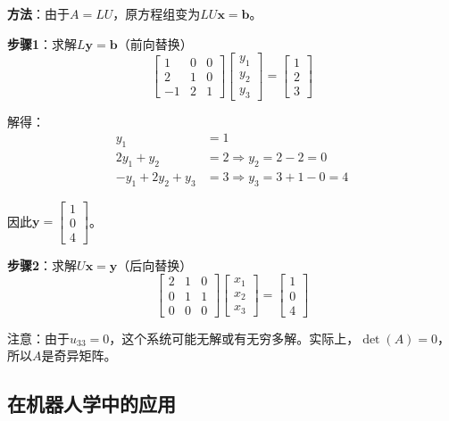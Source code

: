 \documentclass[12pt,a4paper]{article}
\begin{document}
\textbf{方法}：由于$A = LU$，原方程组变为$LU\bm{x} = \bm{b}$。

\textbf{步骤1}：求解$L\bm{y} = \bm{b}$（前向替换）
\begin{equation}
\begin{bmatrix} 1 & 0 & 0 \\ 2 & 1 & 0 \\ -1 & 2 & 1 \end{bmatrix} \begin{bmatrix} y_1 \\ y_2 \\ y_3 \end{bmatrix} = \begin{bmatrix} 1 \\ 2 \\ 3 \end{bmatrix}
\end{equation}

解得：
\begin{align}
y_1 &= 1 \\
2y_1 + y_2 &= 2 \Rightarrow y_2 = 2 - 2 = 0 \\
-y_1 + 2y_2 + y_3 &= 3 \Rightarrow y_3 = 3 + 1 - 0 = 4
\end{align}

因此$\bm{y} = \begin{bmatrix} 1 \\ 0 \\ 4 \end{bmatrix}$。

\textbf{步骤2}：求解$U\bm{x} = \bm{y}$（后向替换）
\begin{equation}
\begin{bmatrix} 2 & 1 & 0 \\ 0 & 1 & 1 \\ 0 & 0 & 0 \end{bmatrix} \begin{bmatrix} x_1 \\ x_2 \\ x_3 \end{bmatrix} = \begin{bmatrix} 1 \\ 0 \\ 4 \end{bmatrix}
\end{equation}

注意：由于$u_{33} = 0$，这个系统可能无解或有无穷多解。实际上，$\det(A) = 0$，所以$A$是奇异矩阵。

\subsection{在机器人学中的应用}
\end{document}
